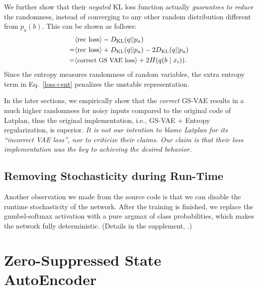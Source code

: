 We further show that their \emph{negated} KL loss function
actually \emph{guarantees to reduce} the randomness,
instead of converging to any other random distribution different from $p_a(b)$.
This can be shown as follows:
\begin{align} 
\nonumber  &\brackets{\text{rec loss}}-D_{\text{KL}}(q||p_a)                                    \\
\nonumber =&\brackets{\text{rec loss}}+D_{\text{KL}}(q||p_a) - 2 D_{\text{KL}}(q||p_a)          \\
\label{loss+ent} =&\brackets{\text{\small correct GS VAE loss}}      + 2 H(q(b \mid x_i)).
\end{align}
Since the entropy measures randomness of random variables,
the extra entropy term in Eq.~\eqref{loss+ent} penalizes the unstable representation.

In the later sections, we empirically show that the \emph{correct} GS-VAE results in
a much higher randomness for noisy inputs compared to the original code of Latplan,
thus the original implementation, i.e., GS-VAE + Entropy regularization, is superior.
% 
\emph{It is not our intention to blame Latplan for its ``incorrect VAE loss'',
nor to criticize their claims.
Our claim is that their loss implementation was the key to achieving the desired behavior.}

\subsection{Removing Stochasticity during Run-Time}

Another observation we made from the source code is that we can
disable the runtime stochasticity of the network.
After the training is finished, we replace the gumbel-softmax activation with
a pure argmax of class probabilities, which makes the network fully deterministic.
(Details in the supplement, .)

\section{Zero-Suppressed State AutoEncoder}
\label{zsae}

